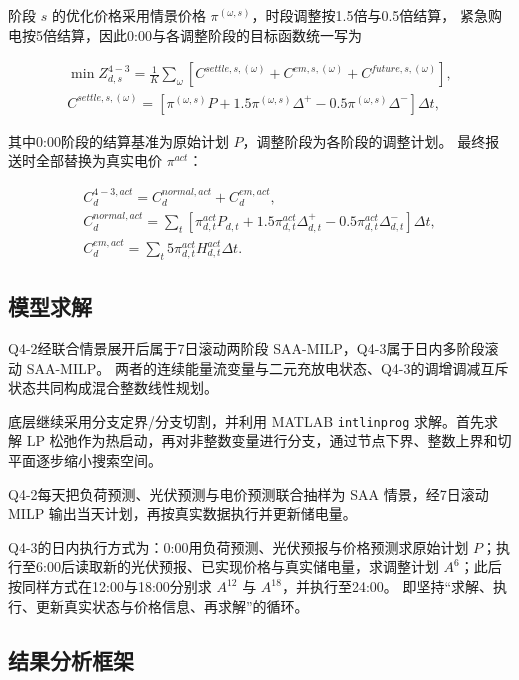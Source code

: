 阶段 \(s\) 的优化价格采用情景价格 \(\pi^{(\omega,s)}\)，时段调整按1.5倍与0.5倍结算，
紧急购电按5倍结算，因此0:00与各调整阶段的目标函数统一写为

\begin{equation}
\begin{gathered}
\min Z_{d,s}^{4-3}=\frac1K\sum_\omega\left[C^{settle,s,(\omega)}+C^{em,s,(\omega)}+C^{future,s,(\omega)}\right],\\
C^{settle,s,(\omega)}=\left[\pi^{(\omega,s)}P+1.5\pi^{(\omega,s)}\Delta^+-0.5\pi^{(\omega,s)}\Delta^-\right]\Delta t,
\end{gathered}
\end{equation}

其中0:00阶段的结算基准为原始计划 \(P\)，调整阶段为各阶段的调整计划。
最终报送时全部替换为真实电价 \(\pi^{act}\)：

\begin{equation}
\begin{gathered}
C_d^{4-3,act}=C_d^{normal,act}+C_d^{em,act},\\
C_d^{normal,act}=\sum_t\left[\pi^{act}_{d,t}P_{d,t}+1.5\pi^{act}_{d,t}\Delta^+_{d,t}-0.5\pi^{act}_{d,t}\Delta^-_{d,t}\right]\Delta t,\\
C_d^{em,act}=\sum_t5\pi^{act}_{d,t}H^{act}_{d,t}\Delta t.
\end{gathered}
\end{equation}

\subsection{模型求解}

Q4-2经联合情景展开后属于7日滚动两阶段 SAA-MILP，Q4-3属于日内多阶段滚动 SAA-MILP。 两者的连续能量流变量与二元充放电状态、Q4-3的调增调减互斥状态共同构成混合整数线性规划。

底层继续采用分支定界/分支切割，并利用 MATLAB \texttt{intlinprog} 求解。首先求解 LP 松弛作为热启动，再对非整数变量进行分支，通过节点下界、整数上界和切平面逐步缩小搜索空间。

Q4-2每天把负荷预测、光伏预测与电价预测联合抽样为 SAA 情景，经7日滚动 MILP 输出当天计划，再按真实数据执行并更新储电量。

Q4-3的日内执行方式为：0:00用负荷预测、光伏预报与价格预测求原始计划 \(P\)；执行至6:00后读取新的光伏预报、已实现价格与真实储电量，求调整计划 \(A^6\)；此后按同样方式在12:00与18:00分别求 \(A^{12}\) 与 \(A^{18}\)，并执行至24:00。
即坚持“求解、执行、更新真实状态与价格信息、再求解”的循环。

\subsection{结果分析框架}

